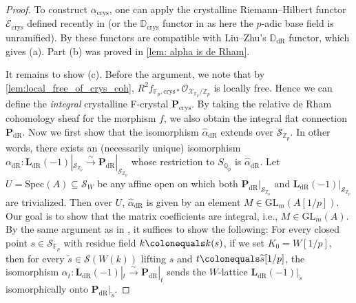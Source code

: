 \documentclass[11pt, letterpaper]{amsart}
\theoremstyle{plain}
\theoremstyle{definition}
\newcommand{\ID}{\mathbb{D}}
\newcommand{\IF}{\mathbb{F}}
\newcommand{\IQ}{\mathbb{Q}}
\newcommand{\IZ}{\mathbb{Z}}
\newcommand{\Spec}{\mathrm{Spec}}
\newcommand{\<}{\langle}
\renewcommand{\>}{\rangle}
\def\wt{\widetilde}
\newcommand{\sE}{\mathcal{E}}
\newcommand{\sO}{\mathcal{O}}
\newcommand{\sX}{\mathcal{X}}
\newcommand{\bL}{\mathbf{L}}
\newcommand{\crys}{\mathrm{crys}}
\newcommand{\sS}{\mathcal{S}}
\newcommand{\bP}{\mathbf{P}}
\newcommand{\dR}{\mathrm{dR}}
\newcommand{\sto}{\stackrel{\sim}{\to}}
\begin{document}
\begin{proof}
    To construct $\alpha_\crys$, one can apply the crystalline Riemann--Hilbert functor $\sE_{\crys}$ defined recently in \cite[Thm.~1.10]{GY24} (or the $\ID_\crys$ functor in \cite[Def.~3.12]{TT19} as here the $p$-adic base field is unramified). 
    By \cite[Thm.~1.10.(iv)]{GY24} these functors are compatible with Liu--Zhu's $\ID_\dR$ functor, which gives (a). Part (b) was proved in \cref{lem: alpha is de Rham}.  

    
    It remains to show (c). 
    Before the argument, we note that by \cref{lem:local_free_of_crys_coh}, $R^2 f_{\IF_p, \crys*} \sO_{\sX_{\IF_p}/\IZ_p}$ is locally free. 
    Hence we can define the \emph{integral} crystalline F-crystal $\bP_\crys$.
    By taking the relative de Rham cohomology sheaf for the morphism $f$, we also obtain the integral flat connection $\bP_\dR$.
    Now we first show that the isomorphism $\hat{\alpha}_\dR$ extends over $\sS_{\IZ_p}$. 
    In other words, there exists an (necessarily unique) isomorphism $\alpha_\dR : \bL_\dR(-1) |_{\sS_{\IZ_p}} \sto \bP_\dR |_{\sS_{\IZ_p}}$ whose restriction to $S_{\IQ_p}$ is $\hat{\alpha}_\dR$. 
    Let $U = \Spec(A) \subseteq \sS_{W}$ be any affine open on which both $\bP_\dR|_{\sS_{\IZ_p}}$ and $\bL_\dR(-1)|_{\sS_{\IZ_p}}$ are trivialized. 
    Then over $U$, $\hat{\alpha}_\dR$ is given by an element $M \in \mathrm{GL}_m(A[1/p])$. 
    Our goal is to show that the matrix coefficients are integral, i.e., $M \in \mathrm{GL}_m(A)$. 
    By the same argument as in \cite[Prop.~5.11]{MPTate}, it suffices to show the following: For every closed point $s \in \sS_{\IF_p}$ with residue field $k \colonequals k(s)$, if we set $K_0 = W[1/p]$, then for every $\wt{s} \in \sS(W(k))$ lifting $s$ and $t \colonequals \wt{s}[1/p]$, the isomorphism $\alpha_{t} : \bL_\dR(-1)|_{t} \sto \bP_\dR|_{t}$ sends the $W$-lattice $\bL_\dR(-1)|_{\wt{s}}$ isomorphically onto $\bP_\dR|_{\wt{s}}$. 
    

\end{proof}
\end{document}
